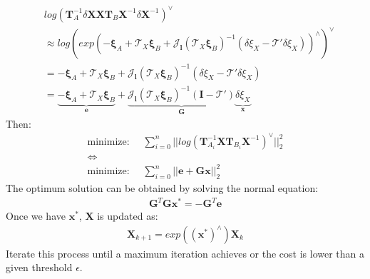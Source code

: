 \documentclass[a4paper]{report}
\begin{document}
\begin{align}
&log \left( \mathbf{T}_{A}^{-1}{\delta\mathbf{X}}\mathbf{X}\mathbf{T}_{B}\mathbf{X}^{-1}{\delta\mathbf{X}^{-1}} \right)^{\vee} \\
&\approx log
\left(
exp 
\left(
-{\mathbf{\xi}_A}+\mathcal{T}_X{\mathbf{\xi}_B} + \mathbf{\mathcal{J}_{l}}
\left(
\mathcal{T}_X{\mathbf{\xi}_B}
\right) ^{-1} 
\left( 
\delta \xi_{X} - \mathbf{\mathcal{T}}' \delta \xi_{X}
\right) 
\right)^{\wedge}
\right)^{\vee} \\
&=-{\mathbf{\xi}_A}+\mathcal{T}_X{\mathbf{\xi}_B} + \mathbf{\mathcal{J}_{l}}
\left(
\mathcal{T}_X{\mathbf{\xi}_B}
\right) ^{-1} 
\left( 
\delta \xi_{X} - \mathbf{\mathcal{T}}' \delta \xi_{X}
\right) \\
&=\underbrace{-{\mathbf{\xi}_A}+\mathcal{T}_X{\mathbf{\xi}_B}}_{\mathbf{e}} + \underbrace{\mathbf{\mathcal{J}_{l}}
\left(
\mathcal{T}_X{\mathbf{\xi}_B}
\right) ^{-1} 
\left( 
\mathbf{I} - \mathbf{\mathcal{T}}' 
\right)}_{\mathbf{G}} \underbrace{\delta \xi_{X}}_{\mathbf{x}}
\end{align}
Then:
\begin{align}
\text{minimize: }& \ \sum_{i=0}^{n} ||log\left( \mathbf{T}_{A_i}^{-1}\mathbf{X}\mathbf{T}_{B_i}\mathbf{X}^{-1} \right)^{\vee}||_2^2 \nonumber \\ \Leftrightarrow  \nonumber \\
\text{minimize: }& \ \sum_{i=0}^{n} ||\mathbf{e}+\mathbf{Gx}||_2^2
\end{align}
The optimum solution can be obtained by solving the normal equation:
\begin{align}
\mathbf{G}^T\mathbf{G}\mathbf{x}^*=-\mathbf{G}^T\mathbf{e}
\end{align}
Once we have $\mathbf{x}^*$, $\mathbf{X}$ is updated as:
\begin{align}
\mathbf{X}_{k+1}=exp\left(\left(\mathbf{x}^*\right)^{\wedge}\right)\mathbf{X}_k
\end{align}
Iterate this process until a maximum iteration achieves or the cost is lower than a given threshold $\epsilon$.
\end{document}
